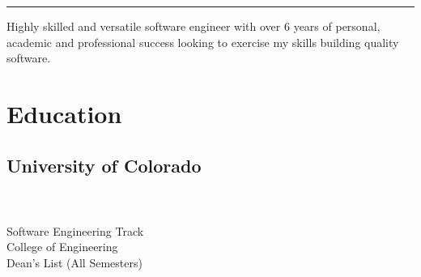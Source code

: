 \documentclass[letterpaper]{deedy-resume}
\begin{document}
\newcommand*{\xdash}[1][3em]{\rule[0.5ex]{#1}{0.55pt}}

\begin{minipage}[t]{0.30\textwidth}

    \vspace{0pt}

    \begin{minipage}{0.9\textwidth}
        \begin{center}

            \fontsize{24pt}{24pt}
            \selectfont{Josh}
            \selectfont{Rahm}

            


            \vspace{10pt}
            \xdash[6em]
            \vspace{10pt}
        \end{center}
    \end{minipage}\cvrule{0pt}{5em}

\raggedright
Highly skilled and versatile software engineer with over 6 years of personal,
academic and professional success looking to exercise my skills building quality
software.




\section{Education}

\subsection{University of Colorado}

\sectionspace

\vspace{\topsep}
\sepbullet {} \\
\sepbullet {} \\
\sepbullet Software Engineering Track \\
\sepbullet College of Engineering \\
\sepbullet Dean's List (All Semesters)




\end{minipage}
\end{document}
